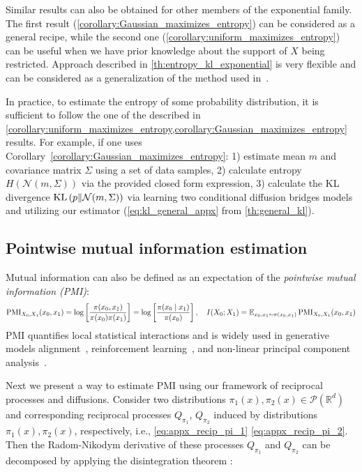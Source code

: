 Similar results can also be obtained for other members of the exponential family.
The first result (\cref{corollary:Gaussian_maximizes_entropy}) can be considered as a general recipe,
while the second one (\cref{corollary:uniform_maximizes_entropy}) can be useful when we have prior knowledge about the support of $X$ being restricted. Approach described in \cref{th:entropy_kl_exponential} is very flexible and can be considered as a generalization of the method used in~\cite{franzese2024minde}. 

In practice, to estimate the entropy of some probability distribution, it is sufficient to follow the one of the described in \cref{corollary:uniform_maximizes_entropy,corollary:Gaussian_maximizes_entropy} results. For example, if one uses Corollary~\ref{corollary:Gaussian_maximizes_entropy}:
1) estimate mean $m$ and covariance matrix $\Sigma$ using a set of data samples,
2) calculate entropy $H(\mathcal{N}(m, \Sigma))$ via the provided closed form expression,
3) calculate the KL divergence $\mathrm{KL}\left(p \middle\Vert \mathcal{N}(m, \Sigma)\right)$ via learning two conditional diffusion bridges models and utilizing our estimator (\eqref{eq:kl_general_appx} from \cref{th:general_kl}).


\subsection{Pointwise mutual information estimation} \label{appx:PMI}

Mutual information can also be defined as an expectation of the \emph{pointwise mutual information (PMI)}:
\begin{equation}
    \label{eq:pointwise_mutual_information}
    \operatorname{\mathrm{PMI}}_{X_0,X_1}(x_0,x_1) = \log \left[ \frac{\pi(x_0, x_1)}{\pi(x_0)\pi(x_1)} \right] = \log \left[ \frac{\pi(x_0 \mid x_1)}{\pi(x_0)} \right], \quad I(X_0;X_1) = \operatorname{\mathbb{E}}_{x_0,x_1 \sim \pi(x_0, x_1)} \operatorname{\mathrm{PMI}}_{X_0,X_1}(x_0, x_1)
\end{equation}
PMI quantifies local statistical interactions and is widely used in generative models alignment~\cite{nandwani2023PMI_NLP,wang2024IT_alignment},
reinforcement learning~\cite{baram2021action_redundancy,yang2024diverse_policies_recovering_PMI}, and non-linear principal component analysis~\citep{cunningham2022principal_component_flows,butakov2024normflows}.

Next we present a way to estimate PMI using our framework of reciprocal processes and diffusions. Consider two distributions $\pi_1(x), \pi_2(x) \in \mathcal{P}(\mathbb{R}^d)$ and corresponding reciprocal processes $Q_{\pi_1}$, $Q_{\pi_2}$ induced by distributions $\pi_1(x), \pi_2(x)$, respectively, i.e., \eqref{eq:appx_recip_pi_1} \eqref{eq:appx_recip_pi_2}. Then the Radom-Nikodym derivative of these processes $Q_{\pi_1}$ and $Q_{\pi_2}$ can be decomposed by applying the disintegration theorem \cite{leonard2014some}:

